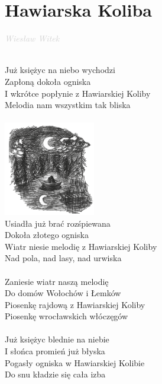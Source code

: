 \documentclass[a5paper, 10pt]{book}
\begin{document}
\section{Hawiarska Koliba}\textcolor{lightgray}{\textit{Wiesław Witek}}\\~\\
\begin{minipage}[t]{0.8\textwidth}
  Już księżyc na niebo wychodzi\\
  Zapłoną dokoła ogniska\\
  I wkrótce popłynie z Hawiarskiej Koliby\\
  Melodia nam wszystkim tak bliska\\
  \\
  \includegraphics[width = 40mm, right]{images/hawiarska_koliba.png}\vspace*{-41.5mm}\\
  Usiadła już brać rozśpiewana\\
  Dokoła złotego ogniska\\
  Wiatr niesie melodię z Hawiarskiej Koliby\\
  Nad pola, nad lasy, nad urwiska\\
  \\
  Zaniesie wiatr naszą melodię\\
  Do domów Wołochów i Łemków\\
  Piosenkę rajdową z Hawiarskiej Koliby\\
  Piosenkę wrocławskich włóczęgów\\
  \\
  Już księżyc blednie na niebie\\
  I słońca promień już błyska\\
  Pogasły ogniska w Hawiarskiej Kolibie\\
  Do snu kładzie się cała izba\\
\end{minipage}
\end{document}
